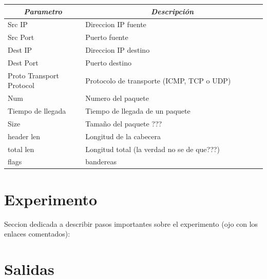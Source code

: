 \documentclass[12pt]{article}
\begin{document}
\begin{table}[htbp]
\centering
\begin{tabular}{|p{0.3\linewidth}|p{0.7\linewidth}|}
\hline
\multicolumn{1}{|c|}{\textit{\textbf{Parametro}}} & \multicolumn{1}{c|}{\textit{\textbf{Descripción}}} \tabularnewline \hline
Src IP & Direccion IP fuente \tabularnewline \hline
Src Port &  Puerto fuente \tabularnewline \hline  
Dest IP & Direccion IP destino \tabularnewline \hline
Dest Port & Puerto destino \tabularnewline \hline
Proto Transport Protocol & Protocolo de transporte  (ICMP, TCP o UDP)  \tabularnewline \hline
Num & Numero del paquete \tabularnewline \hline
Tiempo de llegada & Tiempo de llegada de un paquete \tabularnewline \hline
Size & Tamaño del paquete ??? \tabularnewline \hline
header len & Longitud de la cabecera \tabularnewline \hline
total len & Longitud total (la verdad no se de que???) \tabularnewline \hline
flags & bandereas \tabularnewline \hline
\end{tabular}
\end{table}

\section{Experimento}

Seccion dedicada a describir pasos importantes sobre el experimento (ojo con los enlaces comentados):





\section{Salidas}
\end{document}
